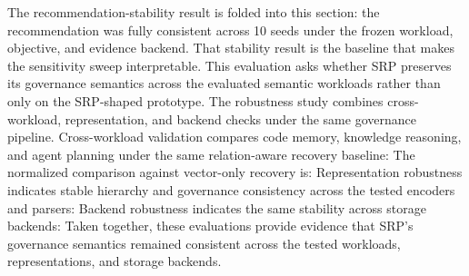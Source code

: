 {}The recommendation-stability result is folded into this section: the recommendation was fully consistent across 10 seeds under the frozen workload, objective, and evidence backend. That stability result is the baseline that makes the sensitivity sweep interpretable.\markdownRendererInterblockSeparator
{}
\markdownRendererSectionEnd \markdownRendererSectionBegin
{}\markdownRendererInterblockSeparator
{}This evaluation asks whether SRP preserves its governance semantics across the evaluated semantic workloads rather than only on the SRP-shaped prototype.\markdownRendererParagraphSeparator
{}The robustness study combines cross-workload, representation, and backend checks under the same governance pipeline.\markdownRendererParagraphSeparator
{}Cross-workload validation compares code memory, knowledge reasoning, and agent planning under the same relation-aware recovery baseline:\markdownRendererInterblockSeparator
{}\markdownRendererInterblockSeparator
{}The normalized comparison against vector-only recovery is:\markdownRendererInterblockSeparator
{}\markdownRendererInterblockSeparator
{}Representation robustness indicates stable hierarchy and governance consistency across the tested encoders and parsers:\markdownRendererInterblockSeparator
{}\markdownRendererInterblockSeparator
{}Backend robustness indicates the same stability across storage backends:\markdownRendererInterblockSeparator
{}\markdownRendererInterblockSeparator
{}Taken together, these evaluations provide evidence that SRP's governance semantics remained consistent across the tested workloads, representations, and storage backends.\markdownRendererInterblockSeparator

